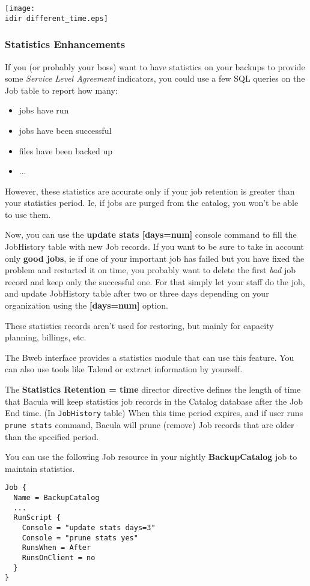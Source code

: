 \texttt{[image: \\idir different\_time.eps]}

\subsubsection{Statistics Enhancements}
If you (or probably your boss) want to have statistics on your backups to
provide some \textit{Service Level Agreement} indicators, you could use a few
SQL queries on the Job table to report how many:

\begin{itemize}
\item jobs have run
\item jobs have been successful
\item files have been backed up
\item ...
\end{itemize}

However, these statistics are accurate only if your job retention is greater
than your statistics period. Ie, if jobs are purged from the catalog, you won't
be able to use them. 

Now, you can use the \textbf{update stats [days=num]} console command to fill
the JobHistory table with new Job records. If you want to be sure to take in
account only \textbf{good jobs}, ie if one of your important job has failed but
you have fixed the problem and restarted it on time, you probably want to
delete the first \textit{bad} job record and keep only the successful one. For
that simply let your staff do the job, and update JobHistory table after two or
three days depending on your organization using the \textbf{[days=num]} option.

These statistics records aren't used for restoring, but mainly for
capacity planning, billings, etc.

The Bweb interface provides a statistics module that can use this feature. You
can also use tools like Talend or extract information by yourself.

The \textbf{Statistics Retention = \lt{}time\gt{}} director directive defines
the length of time that Bacula will keep statistics job records in the Catalog
database after the Job End time. (In \texttt{JobHistory} table) When this time
period expires, and if user runs \texttt{prune stats} command, Bacula will
prune (remove) Job records that are older than the specified period.

You can use the following Job resource in your nightly \textbf{BackupCatalog}
job to maintain statistics.
\begin{verbatim}
Job {
  Name = BackupCatalog
  ...
  RunScript {
    Console = "update stats days=3"
    Console = "prune stats yes"
    RunsWhen = After
    RunsOnClient = no
  }
}
\end{verbatim}


